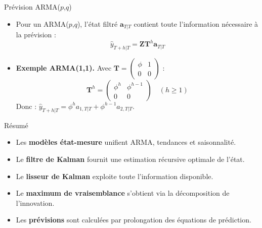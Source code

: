 \documentclass[11pt,aspectratio=169]{beamer}
\begin{document}
\begin{frame}{Prévision ARMA($p$,$q$)}

\begin{itemize}

\item Pour un ARMA($p$,$q$), l'état filtré $\bm{a}_{T|T}$ contient toute l'information nécessaire à la prévision :
  \[
  \hat{y}_{T+h|T} = \bm{Z} \bm{T}^h \bm{a}_{T|T}
  \]\newline

\item \textbf{Exemple ARMA(1,1).} Avec $\bm{T} = \begin{pmatrix} \phi & 1 \\ 0 & 0 \end{pmatrix}$ :
  \[
  \bm{T}^h = \begin{pmatrix} \phi^h & \phi^{h-1} \\ 0 & 0 \end{pmatrix} \quad (h \geq 1)
  \]
  Donc : $\hat{y}_{T+h|T} = \phi^h a_{1,T|T} + \phi^{h-1} a_{2,T|T}$.

\end{itemize}

\end{frame}

\begin{frame}{Résumé}

\begin{itemize}

\item Les \textbf{modèles état-mesure} unifient ARMA, tendances et saisonnalité.\newline

\item Le \textbf{filtre de Kalman} fournit une estimation récursive optimale de l'état.\newline

\item Le \textbf{lisseur de Kalman} exploite toute l'information disponible.\newline

\item Le \textbf{maximum de vraisemblance} s'obtient via la décomposition de l'innovation.\newline

\item Les \textbf{prévisions} sont calculées par prolongation des équations de prédiction.\newline

\end{itemize}

\end{frame}
\end{document}
